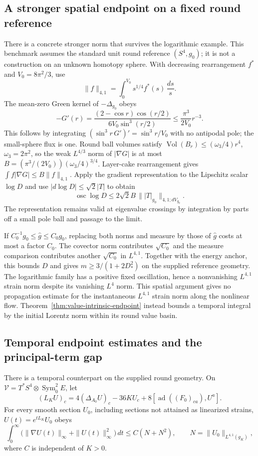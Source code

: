 \documentclass[11pt]{article}
\numberwithin{equation}{section}
\theoremstyle{definition}
\theoremstyle{remark}
\DeclareMathOperator{\Vol}{Vol}
\begin{document}
\subsection{A stronger spatial endpoint on a fixed round reference}
\label{subsec:lorentz-benchmark}

There is a concrete stronger norm that survives the logarithmic example.
This benchmark assumes the standard unit round reference $(S^4,g_0)$;
it is not a construction on an unknown homotopy sphere. With decreasing
rearrangement $f^*$ and $V_0=8\pi^2/3$, use
\[
 \|f\|_{4,1}=\int_0^{V_0}s^{1/4}f^*(s)\,\frac{ds}{s}.
\]
The mean-zero Green kernel of $-\Delta_{g_0}$ obeys
\[
 -G'(r)=\frac{(2-\cos r)\cos(r/2)}{6V_0\sin^3(r/2)}
       \leq \frac{\pi^3}{2V_0}r^{-3}.
\]
This follows by integrating
$(\sin^3r\,G')'=\sin^3r/V_0$ with no antipodal pole;
the small-sphere flux is one. Round ball volumes satisfy
$\Vol(B_r)\leq(\omega_3/4)r^4$, $\omega_3=2\pi^2$, so
the weak $L^{4/3}$ norm of $|\nabla G|$ is at most
$B=(\pi^3/(2V_0))(\omega_3/4)^{3/4}$.
Layer-cake rearrangement gives
$\int f|\nabla G|\leq B\|f\|_{4,1}$.
Apply the gradient representation to the Lipschitz scalar $\log D$
and use $|d\log D|\leq\sqrt2|T|$ to obtain
\[
 \operatorname{osc}\log D\leq2\sqrt2 B\,\||T|_{g_0}\|_{4,1;dV_{g_0}}.
\]
The representation remains valid at eigenvalue crossings by integration
by parts off a small pole ball and passage to the limit.

If $C_0^{-1}g_0\leq\widehat g\leq C_0g_0$, replacing both norms and
measure by those of $\widehat g$ costs at most a factor $C_0$.
The covector norm contributes $\sqrt{C_0}$ and the measure comparison
contributes another $\sqrt{C_0}$ in $L^{4,1}$.
Together with the energy anchor, this bounds $D$ and gives
$m\geq3/(1+2D_*^2)$ on the supplied reference geometry.
The logarithmic family has a positive fixed oscillation, hence a
nonvanishing $L^{4,1}$ strain norm despite its vanishing $L^4$ norm.
This spatial argument gives no propagation estimate for the instantaneous
$L^{4,1}$ strain norm along the nonlinear flow.
Theorem~\ref{thm:value-intrinsic-endpoint} instead bounds a temporal
integral by the initial Lorentz norm within its round value basin.

\subsection{Temporal endpoint estimates and the principal-term gap}
\label{subsec:lorentz-heat}

There is a temporal counterpart on the supplied round geometry.
On $\mathcal V=T^*S^4\otimes\operatorname{Sym}^2_0E$, let
\[
 (L_K U)_c=4(\Delta_{A_0}U)_c-36KU_c
                  +8[\operatorname{ad}((F_0)_{ca}),U^a].
\]
For every smooth section $U_0$, including sections not attained as
linearized strains, $U(t)=e^{tL_K}U_0$ obeys
\begin{equation}\label{endpoint:round-heat}
 \int_0^\infty\bigl(\|\nabla U(t)\|_\infty+
                       \|U(t)\|_\infty^2\bigr)\,dt
 \le C(N+N^2),\qquad N=\|U_0\|_{L^{4,1}(g_K)},
\end{equation}
where $C$ is independent of $K>0$.
\end{document}
